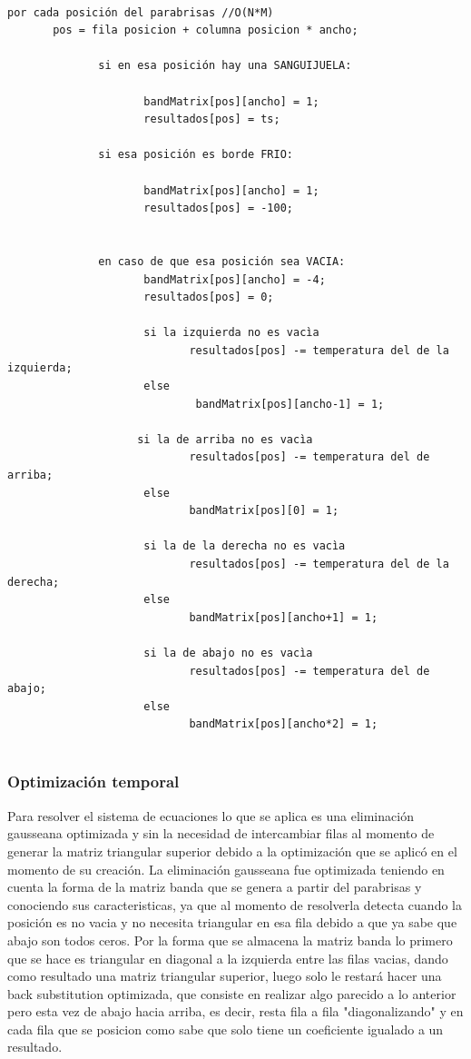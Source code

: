 \begin{verbatim}

por cada posición del parabrisas //O(N*M)
       pos = fila posicion + columna posicion * ancho;
		
              si en esa posición hay una SANGUIJUELA:
			
                     bandMatrix[pos][ancho] = 1;
                     resultados[pos] = ts;
		
              si esa posición es borde FRIO:
                    
                     bandMatrix[pos][ancho] = 1;
                     resultados[pos] = -100;


              en caso de que esa posición sea VACIA:
                     bandMatrix[pos][ancho] = -4;
                     resultados[pos] = 0;
                    
                     si la izquierda no es vacìa
                            resultados[pos] -= temperatura del de la izquierda;
                     else
                             bandMatrix[pos][ancho-1] = 1;

                    si la de arriba no es vacìa
                            resultados[pos] -= temperatura del de arriba;
                     else 
                            bandMatrix[pos][0] = 1;

                     si la de la derecha no es vacìa
                            resultados[pos] -= temperatura del de la derecha;
                     else 
                            bandMatrix[pos][ancho+1] = 1;
                     
                     si la de abajo no es vacìa
                            resultados[pos] -= temperatura del de abajo;
                     else 
                            bandMatrix[pos][ancho*2] = 1;
		

\end{verbatim}
\subsubsection{Optimización temporal}

Para resolver el sistema de ecuaciones lo que se aplica es una eliminación gausseana optimizada y sin la necesidad de intercambiar filas al momento de generar la matriz triangular superior debido a la optimización que se aplicó en el momento de su creación. La eliminación gausseana fue optimizada teniendo en cuenta la forma de la matriz banda que se genera a partir del parabrisas y conociendo sus caracteristicas, ya que al momento de resolverla detecta cuando la posición es no vacia y no necesita triangular en esa fila debido a que ya sabe que abajo son todos ceros. Por la forma que se almacena la matriz banda lo primero que se hace es triangular en diagonal a la izquierda entre las filas vacias, dando como resultado una matriz triangular superior, luego solo le restará hacer una back substitution optimizada, que consiste en realizar algo parecido a lo anterior pero esta vez de abajo hacia arriba, es decir, resta fila a fila "diagonalizando" y en cada fila que se posicion como sabe que solo tiene un coeficiente igualado a un resultado.

